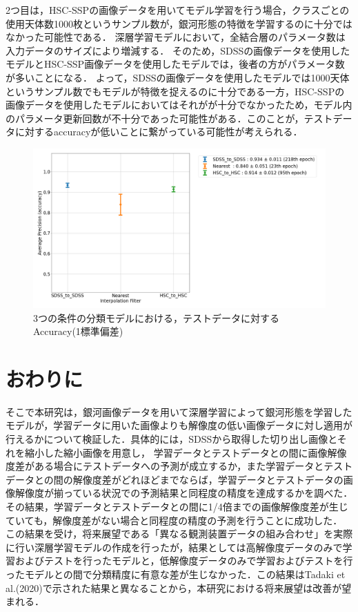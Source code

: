 \documentclass[a4j, 11pt]{jreport}
\begin{document}
2つ目は，HSC-SSPの画像データを用いてモデル学習を行う場合，クラスごとの使用天体数1000枚というサンプル数が，銀河形態の特徴を学習するのに十分ではなかった可能性である．
深層学習モデルにおいて，全結合層のパラメータ数は入力データのサイズにより増減する．
そのため，SDSSの画像データを使用したモデルとHSC-SSP画像データを使用したモデルでは，後者の方がパラメータ数が多いことになる．
よって，SDSSの画像データを使用したモデルでは1000天体というサンプル数でもモデルが特徴を捉えるのに十分である一方，HSC-SSPの画像データを使用したモデルにおいてはそれがが十分でなかったため，モデル内のパラメータ更新回数が不十分であった可能性がある．このことが，テストデータに対するaccuracyが低いことに繋がっている可能性が考えられる．

\begin{figure}[H]
  \centering
  \includegraphics[width=1.0\hsize, keepaspectratio]{images/6syou/acc_with_errorbar_auto_epoch.png}
  \caption{3つの条件の分類モデルにおける，テストデータに対するAccuracy(1標準偏差)}
  \label{fig:6syou_zikkenn}
\end{figure}


\newpage
\chapter{おわりに}
そこで本研究は，銀河画像データを用いて深層学習によって銀河形態を学習したモデルが，学習データに用いた画像よりも解像度の低い画像データに対し適用が行えるかについて検証した．具体的には，SDSSから取得した切り出し画像とそれを縮小した縮小画像を用意し，
学習データとテストデータとの間に画像解像度差がある場合にテストデータへの予測が成立するか，また学習データとテストデータとの間の解像度差がどれほどまでならば，学習データとテストデータの画像解像度が揃っている状況での予測結果と同程度の精度を達成するかを調べた．
その結果，学習データとテストデータとの間に1/4倍までの画像解像度差が生じていても，解像度差がない場合と同程度の精度の予測を行うことに成功した．
この結果を受け，将来展望である「異なる観測装置データの組み合わせ」を実際に行い深層学習モデルの作成を行ったが，結果としては高解像度データのみで学習およびテストを行ったモデルと，低解像度データのみで学習およびテストを行ったモデルとの間で分類精度に有意な差が生じなかった．この結果はTadaki et al.(2020)で示された結果と異なることから，本研究における将来展望は改善が望まれる．
\end{document}
